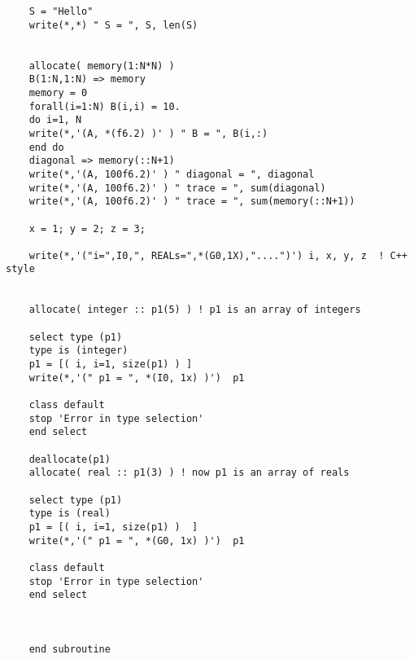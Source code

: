 \begin{verbatim}
    S = "Hello"
    write(*,*) " S = ", S, len(S)
    
    
    allocate( memory(1:N*N) ) 
    B(1:N,1:N) => memory  
    memory = 0
    forall(i=1:N) B(i,i) = 10. 
    do i=1, N 
    write(*,'(A, *(f6.2) )' ) " B = ", B(i,:) 
    end do 
    diagonal => memory(::N+1) 
    write(*,'(A, 100f6.2)' ) " diagonal = ", diagonal
    write(*,'(A, 100f6.2)' ) " trace = ", sum(diagonal)
    write(*,'(A, 100f6.2)' ) " trace = ", sum(memory(::N+1))
    
    x = 1; y = 2; z = 3; 
    
    write(*,'("i=",I0,", REALs=",*(G0,1X),"....")') i, x, y, z  ! C++ style 
    
    
    allocate( integer :: p1(5) ) ! p1 is an array of integers 
    
    select type (p1)
    type is (integer)
    p1 = [( i, i=1, size(p1) ) ] 
    write(*,'(" p1 = ", *(I0, 1x) )')  p1 
    
    class default
    stop 'Error in type selection'
    end select
    
    deallocate(p1) 
    allocate( real :: p1(3) ) ! now p1 is an array of reals 
    
    select type (p1)
    type is (real)
    p1 = [( i, i=1, size(p1) )  ] 
    write(*,'(" p1 = ", *(G0, 1x) )')  p1 
    
    class default
    stop 'Error in type selection'
    end select
    
    
    
    end subroutine 
    
    \end{verbatim}
    
    
    
      
